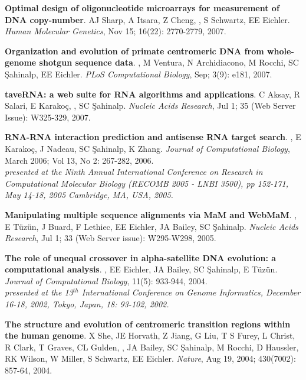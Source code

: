 \vspace{-.2cm}
 {\bf Optimal design of oligonucleotide microarrays for measurement of DNA copy-number}.
 AJ Sharp, A Itsara, Z Cheng, \calkan{}, S Schwartz, EE Eichler.
 {\em Human Molecular Genetics}, Nov 15; 16(22): 2770-2779, 2007.


\vspace{-.2cm}
 {\bf Organization and evolution of primate centromeric DNA from whole-genome shotgun sequence data}.
 \calkan{}, M Ventura, N Archidiacono, M Rocchi, SC \c{S}ahinalp, EE Eichler.
 {\em PLoS Computational Biology}, Sep; 3(9): e181, 2007.


\vspace{-.2cm}
 {\bf taveRNA: a web suite for RNA algorithms and applications}.
  C Aksay, R Salari, E Karako\c{c}, \calkan{}, SC \c{S}ahinalp.
  {\em Nucleic Acids Research}, Jul 1; 35 (Web Server Issue): W325-329, 2007.

\vspace{-.2cm}
 {\bf RNA-RNA interaction prediction and antisense RNA target search}.
  \calkan{}, E Karako\c{c}, J Nadeau, SC \c{S}ahinalp,
  K Zhang.
  {\em Journal of Computational Biology}, March 2006; Vol 13, No 2: 267-282, 2006. \\
\hspace*{1cm} {\footnotesize {\it presented at the Ninth Annual International Conference on Research in Computational Molecular Biology
    (RECOMB 2005 - LNBI 3500), pp 152-171, 
    May 14-18, 2005 Cambridge, MA, USA, 2005.}}


\vspace{-.2cm}
{\bf Manipulating multiple sequence alignments via MaM and  WebMaM}.
\calkan{}, E T\"{u}z\"{u}n, J Buard, F Lethiec,
EE Eichler, JA Bailey, SC \c{S}ahinalp.
{\em Nucleic Acids Research}, Jul 1; 33 (Web Server issue):
W295-W298, 2005.

\vspace{-.2cm}
 {\bf The role of unequal crossover in alpha-satellite 
   DNA evolution: a computational analysis}.
  \calkan{}, EE Eichler, JA Bailey, SC \c{S}ahinalp, E T\"{u}z\"{u}n.
  {\em Journal of Computational Biology}, 11(5): 933-944, 2004. \\
\hspace*{1cm}  {\footnotesize {\it presented at the 13$^{th}$ International Conference on Genome Informatics, 
December 16-18, 2002, Tokyo, Japan, 18: 93-102, 2002.}}

\vspace{-.2cm}
  {\bf The structure and evolution of centromeric transition regions within
    the human genome}.
  X She, JE Horvath, Z Jiang, G Liu, T S Furey,
  L Christ, R Clark, T Graves, CL Gulden, \calkan{}, JA Bailey, SC \c{S}ahinalp, 
  M Rocchi, D Haussler, RK Wilson, W Miller, S Schwartz, EE Eichler.
  {\em Nature}, Aug 19, 2004; 430(7002): 857-64, 2004.


